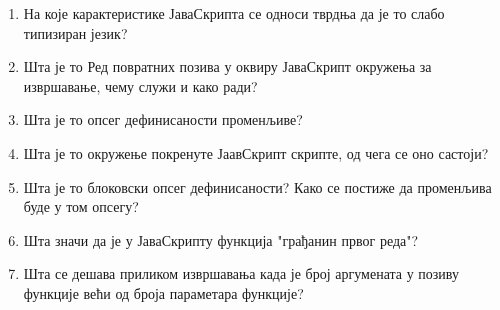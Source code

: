 \documentclass[a4paper]{article}
\begin{document}
\begin{enumerate}
\item На које карактеристике ЈаваСкрипта се односи тврдња да је то слабо типизиран језик? \hrulefill

\hrulefill

\hrulefill

\hrulefill

\hrulefill

\item Шта је то Ред повратних позива у оквиру ЈаваСкрипт окружења за извршавање, чему служи и како ради? \hrulefill

\hrulefill

\hrulefill

\hrulefill

\hrulefill

\item Шта је то опсег дефинисаности променљиве? \hrulefill

\hrulefill

\hrulefill 

\hrulefill

\hrulefill


\item Шта је то окружење покренуте ЈаавСкрипт скрипте, од чега се оно састоји?  \hrulefill

\hrulefill

\hrulefill 

\hrulefill

\hrulefill


\item Шта је то блоковски опсег дефинисаности? Како се постиже да променљива буде у том опсегу? \hrulefill

\hrulefill 

\hrulefill 

\hrulefill

\hrulefill

\item Шта значи да је у ЈаваСкрипту функција "грађанин првог реда"? \hrulefill

\hrulefill 

\hrulefill

\hrulefill

\hrulefill


\item Шта се дешава приликом извршавања када је број аргумената у позиву функције већи од броја параметара функције? \hrulefill

\hrulefill

\hrulefill


\end{enumerate}
\end{document}
